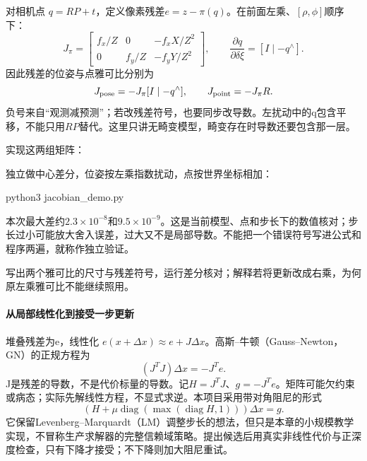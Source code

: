 对相机点 $q=RP+t$，定义像素残差$e=z-\pi(q)$。在前面左乘、$[\rho,\phi]$顺序下：
\[
J_\pi=
\begin{bmatrix}f_x/Z&0&-f_xX/Z^2\\0&f_y/Z&-f_yY/Z^2\end{bmatrix},\qquad
\frac{\partial q}{\partial\delta\xi}=[I\mid-q^\wedge].
\]
因此残差的位姿与点雅可比分别为
\[
J_{\rm pose}=-J_\pi[I\mid-q^\wedge],\qquad J_{\rm point}=-J_\pi R.
\]
负号来自“观测减预测”；若改残差符号，也要同步改导数。左扰动中的q包含平移，不能只用$RP$替代。这里只讲无畸变模型，畸变存在时导数还要包含那一层。

\begin{example}[不靠肉眼相信雅可比]
实现这两组矩阵：

独立做中心差分，位姿按左乘指数扰动，点按世界坐标相加：

\begin{tbash}
python3 jacobian_demo.py
\end{tbash}
本次最大差约$2.3\times10^{-8}$和$9.5\times10^{-9}$。这是当前模型、点和步长下的数值核对；步长过小可能放大舍入误差，过大又不是局部导数。不能把一个错误符号写进公式和程序两遍，就称作独立验证。
\end{example}
\begin{exercise}\label{ex:v2-ba-jacobian}
写出两个雅可比的尺寸与残差符号，运行差分核对；解释若将更新改成右乘，为何原左乘雅可比不能继续照用。
\end{exercise}

\paragraph*{从局部线性化到接受一步更新}
堆叠残差为e，线性化 $e(x+\Delta x)\approx e+J\Delta x$。高斯--牛顿（Gauss--Newton，GN）的正规方程为
\begin{equation}
(J^TJ)\Delta x=-J^Te.
\label{eq:normal_equation}
\end{equation}
J是残差的导数，不是代价标量的导数。记$H=J^TJ$、$g=-J^Te$。矩阵可能欠约束或病态；实际先解线性方程，不显式求逆。本项目采用带对角阻尼的形式
\[
(H+\mu\operatorname{diag}(\max(\operatorname{diag}H,1)))\Delta x=g.
\]
它保留Levenberg--Marquardt（LM）调整步长的想法，但只是本章的小规模教学实现，不冒称生产求解器的完整信赖域策略。提出候选后用真实非线性代价与正深度检查，只有下降才接受；不下降则加大阻尼重试。


